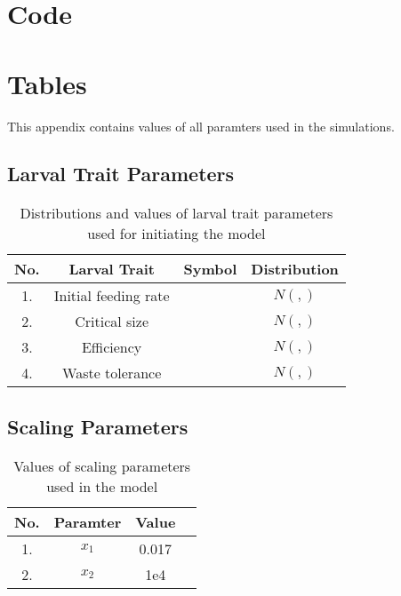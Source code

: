 \chapter{Code}
\chapter{Tables}
This appendix contains values of all paramters used in the simulations.
\section{Larval Trait Parameters}
\begin{table}[h!]
  \centering
  \begin{tabular}{|c|c|c|c|}
    \hline
    \textbf{No.} & \textbf{Larval Trait} & \textbf{Symbol} & \textbf{Distribution} \\
    \hline
    1. & Initial feeding rate & & $N(,)$ \\
    \hline
    2. & Critical size & & $N(,)$ \\
    \hline
    3. & Efficiency & & $N(,)$ \\
    \hline
    4. & Waste tolerance & & $N(,)$ \\
    \hline
  \end{tabular}
  \caption{Distributions and values of larval trait parameters used for initiating the model}
  \label{tab:trait_value}
\end{table}
\section{Scaling Parameters}
\begin{table}[h!]
  \centering
  \begin{tabular}{|c|c|c|c|}
    \hline
    \textbf{No.} & \textbf{Paramter} & \textbf{Value} \\
    \hline
    1. & $x_{1}$ & 0.017 \\
    \hline
    2. & $x_{2}$ & 1e4 \\
    \hline
  \end{tabular}
  \caption{Values of scaling parameters used in the model}
  \label{tab:scale_param}
\end{table}
\newpage

